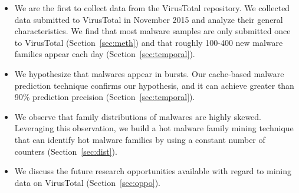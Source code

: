 \begin{itemize}

\item We are the first to collect data from the VirusTotal repository.
We collected data submitted to VirusTotal in November 2015 
and analyze their general characteristics. 
We find that most malware samples are only submitted once to VirusTotal (Section~\ref{sec:meth}) 
and that roughly 100-400 new malware families appear each day (Section~\ref{sec:temporal}). 


\item We hypothesize that malwares appear in bursts. 
Our cache-based malware prediction technique confirms our hypothesis, 
and it can achieve greater than 90\% prediction precision (Section~\ref{sec:temporal}). 

\item We observe that family distributions of malwares are highly skewed. 
Leveraging this observation, we build a hot malware family mining technique that can identify hot 
malware families by using a constant number of counters (Section~\ref{sec:dist}).

\item We discuss the future research opportunities available with regard to mining data on VirusTotal (Section~\ref{sec:oppo}). 

\end{itemize}


